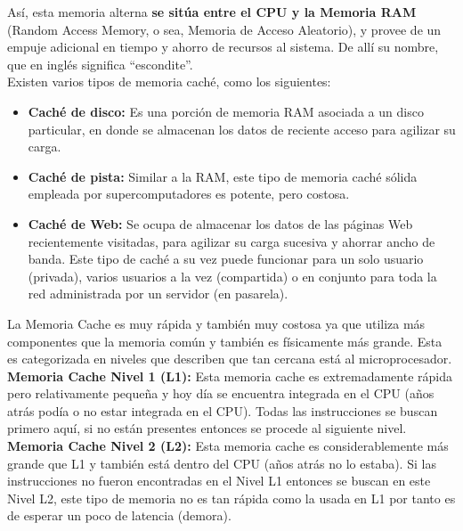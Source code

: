 \documentclass[10pt,letterpaper]{article}
\begin{document}
\begin{justify}
	\noindent
	Así, esta memoria alterna \textbf{se sitúa entre el CPU y la Memoria RAM} (Random Access Memory, o sea, Memoria de Acceso Aleatorio), y provee de un empuje adicional en tiempo y ahorro de recursos al sistema. De allí su nombre, que en inglés significa “escondite”.\\
	
	\noindent
	Existen varios tipos de memoria caché, como los siguientes:\\
	
	\begin{itemize}	
	\item \textbf{Caché de disco:} Es una porción de memoria RAM asociada a un disco particular, en donde se almacenan los datos de reciente acceso para agilizar su carga.\\
	\item \textbf{Caché de pista:} Similar a la RAM, este tipo de memoria caché sólida empleada por supercomputadores es potente, pero costosa.\\
	\item \textbf{Caché de Web:} Se ocupa de almacenar los datos de las páginas Web recientemente visitadas, para agilizar su carga sucesiva y ahorrar ancho de banda. Este tipo de caché a su vez puede funcionar para un solo usuario (privada), varios usuarios a la vez (compartida) o en conjunto para toda la red administrada por un servidor (en pasarela).
	\end{itemize}

	\noindent
	La Memoria Cache es muy rápida y también muy costosa ya que utiliza más componentes que la memoria común y también es físicamente más grande. Esta es categorizada en niveles que describen que tan cercana está al microprocesador.\cite{tercera} \\ 
	
	\noindent
	\textbf{Memoria Cache Nivel 1 (L1):}
	Esta memoria cache es extremadamente rápida pero relativamente pequeña y hoy día se encuentra integrada en el CPU (años atrás podía o no estar integrada en el CPU). Todas las instrucciones se buscan primero aquí, si no están presentes entonces se procede al siguiente nivel.\\
	
	\noindent
	\textbf{Memoria Cache Nivel 2 (L2):}
	Esta memoria cache es considerablemente más grande que L1 y también está dentro del CPU (años atrás no lo estaba). Si las instrucciones no fueron encontradas en el Nivel L1 entonces se buscan en este Nivel L2, este tipo de memoria no es tan rápida como la usada en L1 por tanto es de esperar un poco de latencia (demora).\\
	

\end{justify}
\end{document}
